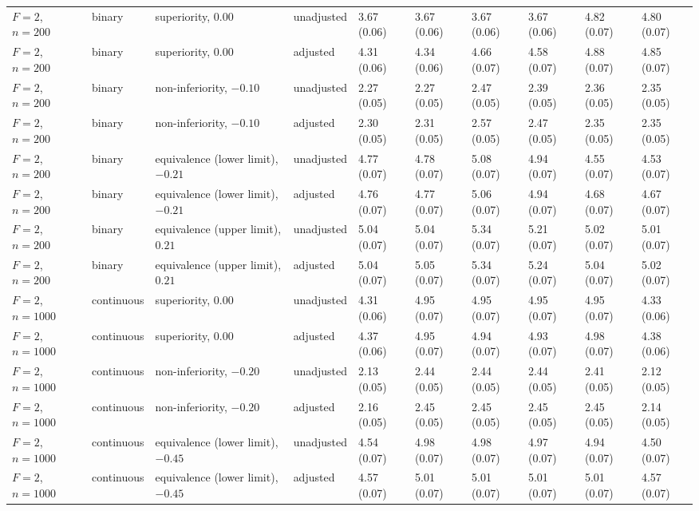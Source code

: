 \begin{landscape}
\begin{singlespace}
\begin{longtable}{@{}llllllllll@{}}
$F=2$, $n=200$ & binary & superiority, $0.00$ & unadjusted & 3.67 (0.06) & 3.67 (0.06) & 3.67 (0.06) & 3.67 (0.06) & 4.82 (0.07) & 4.80 (0.07)\\
$F=2$, $n=200$ & binary & superiority, $0.00$ & adjusted & 4.31 (0.06) & 4.34 (0.06) & 4.66 (0.07) & 4.58 (0.07) & 4.88 (0.07) & 4.85 (0.07)\\
$F=2$, $n=200$ & binary & non-inferiority, $-0.10$ & unadjusted & 2.27 (0.05) & 2.27 (0.05) & 2.47 (0.05) & 2.39 (0.05) & 2.36 (0.05) & 2.35 (0.05)\\
$F=2$, $n=200$ & binary & non-inferiority, $-0.10$ & adjusted & 2.30 (0.05) & 2.31 (0.05) & 2.57 (0.05) & 2.47 (0.05) & 2.35 (0.05) & 2.35 (0.05)\\
$F=2$, $n=200$ & binary & equivalence (lower limit), $-0.21$ & unadjusted & 4.77 (0.07) & 4.78 (0.07) & 5.08 (0.07) & 4.94 (0.07) & 4.55 (0.07) & 4.53 (0.07)\\
$F=2$, $n=200$ & binary & equivalence (lower limit), $-0.21$ & adjusted & 4.76 (0.07) & 4.77 (0.07) & 5.06 (0.07) & 4.94 (0.07) & 4.68 (0.07) & 4.67 (0.07)\\
$F=2$, $n=200$ & binary & equivalence (upper limit), $0.21$ & unadjusted & 5.04 (0.07) & 5.04 (0.07) & 5.34 (0.07) & 5.21 (0.07) & 5.02 (0.07) & 5.01 (0.07)\\
$F=2$, $n=200$ & binary & equivalence (upper limit), $0.21$ & adjusted & 5.04 (0.07) & 5.05 (0.07) & 5.34 (0.07) & 5.24 (0.07) & 5.04 (0.07) & 5.02 (0.07)\\
$F=2$, $n=1000$ & continuous & superiority, $0.00$ & unadjusted & 4.31 (0.06) & 4.95 (0.07) & 4.95 (0.07) & 4.95 (0.07) & 4.95 (0.07) & 4.33 (0.06)\\
$F=2$, $n=1000$ & continuous & superiority, $0.00$ & adjusted & 4.37 (0.06) & 4.95 (0.07) & 4.94 (0.07) & 4.93 (0.07) & 4.98 (0.07) & 4.38 (0.06)\\
$F=2$, $n=1000$ & continuous & non-inferiority, $-0.20$ & unadjusted & 2.13 (0.05) & 2.44 (0.05) & 2.44 (0.05) & 2.44 (0.05) & 2.41 (0.05) & 2.12 (0.05)\\
$F=2$, $n=1000$ & continuous & non-inferiority, $-0.20$ & adjusted & 2.16 (0.05) & 2.45 (0.05) & 2.45 (0.05) & 2.45 (0.05) & 2.45 (0.05) & 2.14 (0.05)\\
$F=2$, $n=1000$ & continuous & equivalence (lower limit), $-0.45$ & unadjusted & 4.54 (0.07) & 4.98 (0.07) & 4.98 (0.07) & 4.97 (0.07) & 4.94 (0.07) & 4.50 (0.07)\\
$F=2$, $n=1000$ & continuous & equivalence (lower limit), $-0.45$ & adjusted & 4.57 (0.07) & 5.01 (0.07) & 5.01 (0.07) & 5.01 (0.07) & 5.01 (0.07) & 4.57 (0.07)\\

\end{longtable}
\end{singlespace}
\end{landscape}
